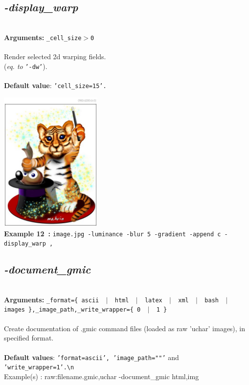 \documentclass[a4paper,11pt,twoside]{book}
\begin{document}
\subsection{\emph{-display\_warp} }\vspace*{-0.5em}
~\\\textbf{Arguments: } 
{\small \texttt{\_cell\_size$>$0}}\\~\\
Render selected 2d warping fields.
~\\(\emph{eq. to} {\small \texttt{'-dw'}}).
~\\~\\\textbf{Default value}: {\small \texttt{'cell\_size=15'.}}
\begin{center}\includegraphics[keepaspectratio=true,height=7cm,width=\textwidth]{img/gmic_def12.jpg}\\
{\footnotesize \textbf{Example 12~:} \texttt{image.jpg -luminance -blur 5 -gradient -append c -display\_warp ,}}
\end{center}

\subsection{\emph{-document\_gmic} }\vspace*{-0.5em}
~\\\textbf{Arguments: } 
{\small \texttt{\_format=\{ ascii ~$|$~ html ~$|$~ latex ~$|$~ xml ~$|$~ bash ~$|$~ images \},\_image\_path,\_write\_wrapper=\{ 0 ~$|$~ 1 \}}}\\~\\
Create documentation of .gmic command files (loaded as raw 'uchar' images), in specified format.
~\\~\\\textbf{Default values}: {\small \texttt{'format=ascii', 'image\_path=""'} and \texttt{'write\_wrapper=1'.\textbackslash n}}
~\\Example(s) : raw:filename.gmic,uchar -document\_gmic html,img
\end{document}
